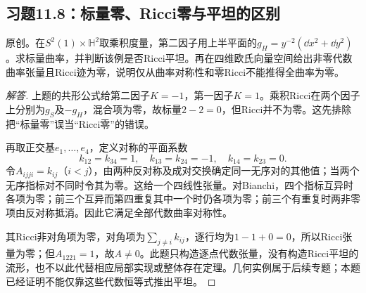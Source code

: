 \subsection*{习题11.8：标量零、Ricci零与平坦的区别}
原创。在$S^2(1)\times\mathbb H^2$取乘积度量，第二因子用上半平面的$g_H=y^{-2}(\dd x^2+\dd y^2)$。求标量曲率，并判断该例是否Ricci平坦。再在四维欧氏向量空间给出非零代数曲率张量且Ricci迹为零，说明仅从曲率对称性和零Ricci不能推得全曲率为零。
\begin{proof}[解答]
上题的共形公式给第二因子$K=-1$，第一因子$K=1$。乘积Ricci在两个因子上分别为$g_S$及$-g_H$，混合项为零，故标量$2-2=0$，但Ricci并不为零。这先排除把“标量零”误当“Ricci零”的错误。

再取正交基$e_1,\ldots,e_4$，定义对称的平面系数
\[
 k_{12}=k_{34}=1,\quad k_{13}=k_{24}=-1,\quad k_{14}=k_{23}=0.
\]
令$A_{ijji}=k_{ij}$（$i<j$），由两种反对称及成对交换确定同一无序对的其他值；当两个无序指标对不同时令其为零。这给一个四线性张量。对Bianchi，四个指标互异时各项为零；前三个互异而第四重复其中一个时仍各项为零；前三个有重复时两非零项由反对称抵消。因此它满足全部代数曲率对称性。

其Ricci非对角项为零，对角项为$\sum_{j\ne i}k_{ij}$，逐行均为$1-1+0=0$，所以Ricci张量为零；但$A_{1221}=1$，故$A\ne0$。此题只构造逐点代数张量，没有构造Ricci平坦的流形，也不以此代替相应局部实现或整体存在定理。几何实例属于后续专题；本题已经证明不能仅靠这些代数恒等式推出平坦。
\end{proof}
